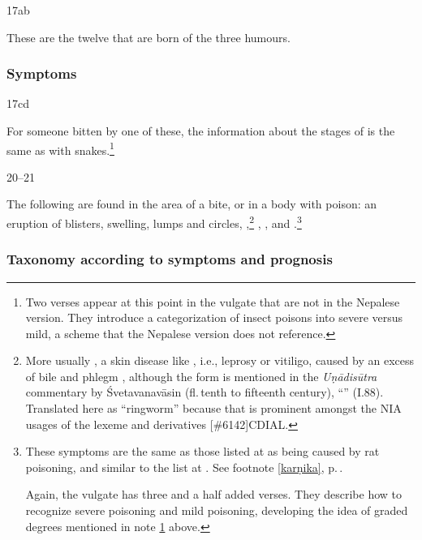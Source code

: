 \begin{translation}
\item[17ab]

These are the twelve that are born of the three humours.

\subsubsection{Symptoms}

\item[17cd] 

For someone bitten by one of these, the information about the stages
of  is the same as with snakes.\footnote{Two
    verses appear at this point in the vulgate that are not in the
    Nepalese version.  They introduce a categorization of insect poisons
    into severe versus mild, a scheme that the Nepalese version does not
    reference.\label{gradation}}

\item[20--21] 

The following are found in the area of a bite, or in a body
 with poison: an eruption of blisters, swelling,
lumps and circles, ,\footnote{More usually
    , a skin disease like , i.e., leprosy or
    vitiligo, caused by an excess of bile and phlegm
    \citep[390]{josi-maha}, although the form  is mentioned in
    the \emph{Uṇādisūtra} commentary by Śvetavanavāsin (fl.\,tenth to
    fifteenth century), “” (I.88). Translated
    here as “ringworm” because that is prominent amongst the NIA usages of
    the lexeme and derivatives
    [\#6142]{CDIAL}.} %
, ,
and .\footnote{These symptoms
    are the same as those listed at  as being caused by rat
    poisoning, and similar to the list at .  See footnote
    \ref{karṇika}, p.\,\pageref{karṇika}.
    
    Again, the vulgate has three and a half added verses.  They describe how to 
    recognize severe poisoning and mild poisoning, developing the idea of graded 
    degrees mentioned in note \ref{gradation} above.}

\subsubsection{Taxonomy according to symptoms and prognosis}


\end{translation}
